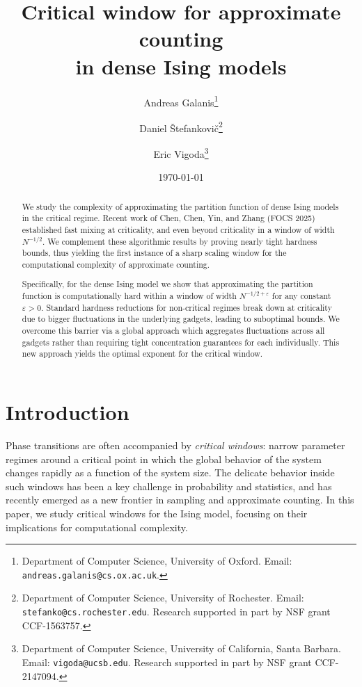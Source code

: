 \documentclass[11pt]{article}
\author{
Andreas Galanis\thanks{Department of Computer Science, University of Oxford. Email:
   \texttt{andreas.galanis@cs.ox.ac.uk}.
 }
 \and
 Daniel \v{S}tefankovi\v{c}\thanks{Department of Computer Science, University of Rochester. Email: \texttt{stefanko@cs.rochester.edu}. Research supported in part by NSF grant CCF-1563757.}
 \and 
 Eric Vigoda\thanks{Department of Computer Science, University of California, Santa Barbara. Email: \texttt{vigoda@ucsb.edu}. Research supported in part by NSF grant CCF-2147094.}
 }
\title{Critical window for approximate counting\\ in dense Ising models}
\date{\today}
\begin{document}
\maketitle
\begin{abstract}
We study the complexity of approximating the partition function of dense Ising models in the critical regime. Recent work of Chen, Chen, Yin, and Zhang (FOCS 2025) established fast mixing  at criticality, and even beyond criticality  in a window of width $N^{-1/2}$. We complement these algorithmic results by proving nearly tight hardness bounds, thus yielding the first instance of a sharp scaling window for the computational complexity of approximate counting.

Specifically, for the dense Ising model we show that approximating the partition function is computationally hard within a window of width \(N^{-1/2+\varepsilon}\) for any constant \(\varepsilon>0\). Standard hardness reductions for non-critical regimes break down at criticality due to bigger fluctuations in the underlying gadgets, leading to suboptimal bounds. We overcome this barrier via a global approach which aggregates fluctuations across all gadgets rather than requiring tight concentration guarantees for each individually. This new approach yields the optimal exponent for the critical window.\let\thefootnote\relax{}
\end{abstract}
\section{Introduction}

Phase transitions are often accompanied by \emph{critical windows}: narrow parameter regimes around a critical point in which the global behavior of the system changes rapidly as a function of the system size. The delicate behavior inside such windows has been a key challenge in probability and statistics, and has recently emerged as a new frontier in sampling and approximate counting. In this paper, we study critical windows for the Ising model, focusing on their implications for computational complexity.
\end{document}
